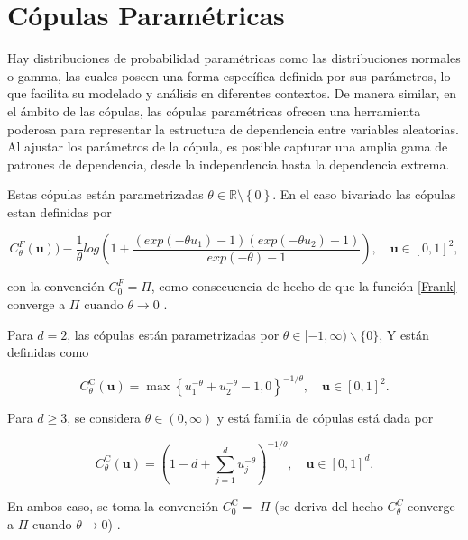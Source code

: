 
\section{Cópulas Paramétricas}

Hay distribuciones de probabilidad paramétricas como las distribuciones normales o gamma, las cuales poseen una forma específica definida por sus parámetros, lo que facilita su modelado y análisis en diferentes contextos. De manera similar, en el ámbito de las cópulas, las cópulas paramétricas ofrecen una herramienta poderosa para  representar la estructura de dependencia entre variables aleatorias. Al ajustar los parámetros de la cópula, es posible capturar una amplia gama de patrones de dependencia, desde la independencia hasta la dependencia extrema. 

\begin{ejemplo}
    Estas cópulas están parametrizadas $\theta \in \mathbb{R} \setminus \left\{ 0 \right\}$. En el caso bivariado las cópulas estan definidas por

    \begin{equation}\label{Frank}
    C_{\theta}^{F}(\boldsymbol{u}) ) -\frac{1}{\theta} log\left ( 1 + \frac{(exp(-\theta u_1)-1)(exp(-\theta u_2)-1)}{exp(-\theta)-1} \right ), \quad \boldsymbol{u} \in [0, 1]^2,    
    \end{equation}
    
con la convención $C_{0}^{F} = \Pi$, como consecuencia de hecho de que la función \eqref{Frank} converge a $\Pi$ cuando $\theta \to 0$ \cite{CopulasR}.
\end{ejemplo}

\begin{ejemplo}
    Para $d=2$, las cópulas están parametrizadas por $\theta \in[-1, \infty) \backslash\{0\}$, Y están definidas como

    \begin{equation}
    C_\theta^{\mathrm{C}}(\boldsymbol{u})=\max \left\{u_1^{-\theta}+u_2^{-\theta}-1,0\right\}^{-1 / \theta}, \quad \boldsymbol{u} \in[0,1]^2.
\end{equation}

    Para $d \geq 3$, se considera $\theta \in(0, \infty)$ y está familia de cópulas está dada por

    \begin{equation}
    C_\theta^{\mathrm{C}}(\boldsymbol{u})=\left(1-d+\sum_{j=1}^d u_j^{-\theta}\right)^{-1 / \theta}, \quad \boldsymbol{u} \in[0,1]^d .
    \end{equation}

    En ambos caso, se toma la convención $C_0^{\mathrm{C}}=$ $\Pi$ (se deriva del hecho $C_\theta^C$ converge a $\Pi$ cuando $\theta \rightarrow 0$) \cite{CopulasR}.
\end{ejemplo}


